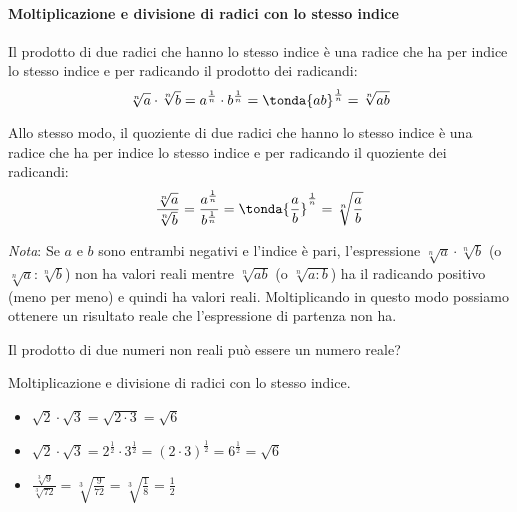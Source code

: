 \paragraph{Moltiplicazione e divisione di radici con lo stesso indice}

Il prodotto di due radici che hanno lo stesso indice è una radice che ha 
per indice lo stesso indice e per radicando il prodotto dei radicandi:
\[\sqrt[n]a \cdot \sqrt[n]b=
a^\frac{1}{n} \cdot b^\frac{1}{n} =
\tonda{ab}^\frac{1}{n} =
\sqrt[n]{ab}\]

Allo stesso modo, il quoziente di due radici che hanno lo stesso indice è 
una radice che ha per indice lo stesso indice e per radicando il 
quoziente dei radicandi:
\[\frac{\sqrt[n]a}{\sqrt[n]b}=
\frac{a^\frac{1}{n}}{b^\frac{1}{n}} =
\tonda{\frac{a}{b}}^\frac{1}{n} =
\sqrt[n]{\frac{a}{b}}\]

\emph{Nota}: 
Se \(a\) e \(b\) sono entrambi negativi e l'indice è pari, l'espressione
\(\sqrt[n]a \cdot \sqrt[n]b\) (o \(\sqrt[n]a : \sqrt[n]b\)) non ha valori 
reali mentre \(\sqrt[n]{ab}\) (o \(\sqrt[n]{a : b}\)) ha il
radicando positivo (meno per meno) e quindi ha valori reali. 
Moltiplicando in questo modo  possiamo ottenere un risultato reale che 
l'espressione di partenza non ha.

Il prodotto di due numeri non reali può essere un numero reale?


% 
\begin{esempio}{}{}
Moltiplicazione e divisione di radici con lo stesso indice.
\begin{itemize}
\item \(\sqrt{2} \cdot \sqrt{3}=\sqrt{2 \cdot 3}=\sqrt 6\)
\item \(\sqrt{2} \cdot \sqrt{3}=
      2^{\frac{1}{2}} \cdot 3^{\frac{1}{2}}=(2  \cdot 3)^{\frac{1}{2}}=
      6^{\frac{1}{2}}=\sqrt 6\)
\item \(\frac{\sqrt[3]9}{\sqrt[3]{72}}=\sqrt[3]{\frac 9{72}}=
      \sqrt[3]{\frac 1 8}=\frac 1 2\)
\end{itemize}
\end{esempio}
% 

